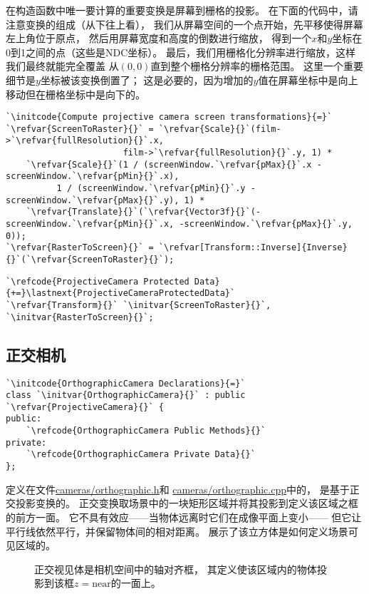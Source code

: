 在构造函数中唯一要计算的重要变换是屏幕到栅格的投影。
在下面的代码中，请注意变换的组成（从下往上看），
我们从屏幕空间的一个点开始，先平移使得屏幕左上角位于原点，
然后用屏幕宽度和高度的倒数进行缩放，
得到一个$x$和$y$坐标在0到1之间的点（这些是NDC坐标）。
最后，我们用栅格化分辨率进行缩放，这样我们最终就能完全覆盖
从$(0,0)$直到整个栅格分辨率的栅格范围。
这里一个重要细节是$y$坐标被该变换倒置了；
这是必要的，因为增加的$y$值在屏幕坐标中是向上移动但在栅格坐标中是向下的。
\begin{lstlisting}
`\initcode{Compute projective camera screen transformations}{=}`
`\refvar{ScreenToRaster}{}` = `\refvar{Scale}{}`(film->`\refvar{fullResolution}{}`.x, 
                       film->`\refvar{fullResolution}{}`.y, 1) *
    `\refvar{Scale}{}`(1 / (screenWindow.`\refvar{pMax}{}`.x - screenWindow.`\refvar{pMin}{}`.x),
          1 / (screenWindow.`\refvar{pMin}{}`.y - screenWindow.`\refvar{pMax}{}`.y), 1) *
    `\refvar{Translate}{}`(`\refvar{Vector3f}{}`(-screenWindow.`\refvar{pMin}{}`.x, -screenWindow.`\refvar{pMax}{}`.y, 0));
`\refvar{RasterToScreen}{}` = `\refvar[Transform::Inverse]{Inverse}{}`(`\refvar{ScreenToRaster}{}`);
\end{lstlisting}
\begin{lstlisting}
`\refcode{ProjectiveCamera Protected Data}{+=}\lastnext{ProjectiveCameraProtectedData}`
`\refvar{Transform}{}` `\initvar{ScreenToRaster}{}`, `\initvar{RasterToScreen}{}`;
\end{lstlisting}

\subsection{正交相机}\label{sub:正交相机}
\begin{lstlisting}
`\initcode{OrthographicCamera Declarations}{=}`
class `\initvar{OrthographicCamera}{}` : public `\refvar{ProjectiveCamera}{}` {
public:
    `\refcode{OrthographicCamera Public Methods}{}`
private:
    `\refcode{OrthographicCamera Private Data}{}`
};
\end{lstlisting}

定义在文件\href{https://github.com/mmp/pbrt-v3/blob/master/src/cameras/orthographic.h}{\ttfamily cameras/orthographic.h}和
\href{https://github.com/mmp/pbrt-v3/tree/master/src/cameras/orthographic.cpp}{\ttfamily cameras/orthographic.cpp}中的，
是基于正交投影变换的。
正交变换取场景中的一块矩形区域并将其投影到定义该区域之框的前方一面。
它不具有效应——当物体远离时它们在成像平面上变小——
但它让平行线依然平行，并保留物体间的相对距离。
展示了该立方体是如何定义场景可见区域的。
\begin{figure}[htbp]
    \centering
    \caption{正交视见体是相机空间中的轴对齐框，
        其定义使该区域内的物体投影到该框$z=\text{near}$的一面上。}
    \label{fig:6.2}
\end{figure}


